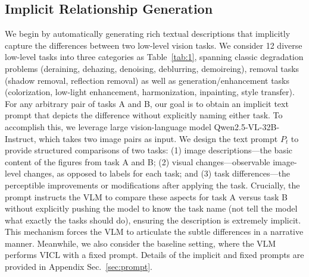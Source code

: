 \subsection{Implicit Relationship Generation}
We begin by automatically generating rich textual descriptions that implicitly capture the differences between two low-level vision tasks. We consider 12 diverse low-level tasks into three categories as Table~\ref{tab:1}, spanning classic degradation problems (deraining, dehazing, denoising, deblurring, demoireing), removal tasks (shadow removal, reflection removal) as well as generation/enhancement tasks (colorization, low-light enhancement, harmonization, inpainting, style transfer). For any arbitrary pair of tasks A and B, our goal is to obtain an implicit text prompt that depicts the difference without explicitly naming either task. To accomplish this, we leverage large vision-language model Qwen2.5-VL-32B-Instruct, which takes two image pairs as input. We design the text prompt $P_t$ to provide structured comparisons of two tasks: (1) image descriptions---the basic content of the figures from task A and B; (2) visual changes---observable image-level changes, as opposed to labels for each task; and (3) task differences---the perceptible improvements or modifications after applying the task. Crucially, the prompt instructs the VLM to compare these aspects for task A versus task B without explicitly pushing the model to know the task name (not tell the model what exactly the tasks should do), ensuring the description is extremely implicit. This mechanism forces the VLM to articulate the subtle differences in a narrative manner. Meanwhile, we also consider the baseline setting, where the VLM performs VICL with a fixed prompt. Details of the implicit and fixed prompts are provided in Appendix Sec.~\ref{sec:prompt}.



